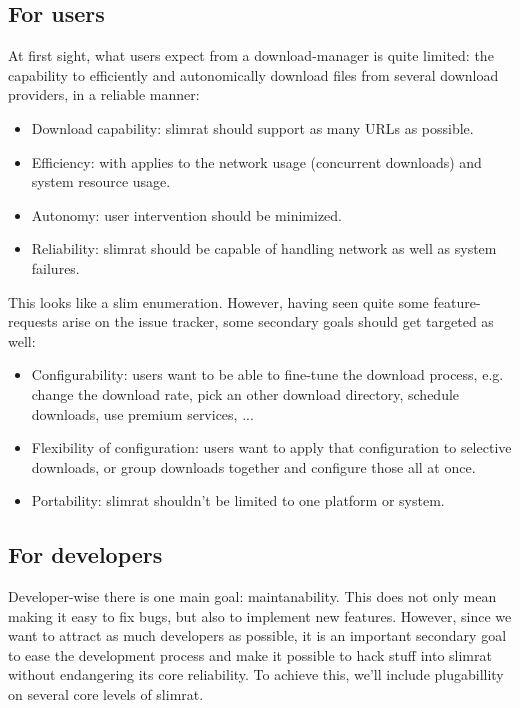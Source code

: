\documentclass{article}
\begin{document}
\subsection{For users}

At first sight, what users expect from a download-manager is quite limited: the capability to efficiently and autonomically download files from several download providers, in a reliable manner:
\begin{itemize}
\item{Download capability: slimrat should support as many URLs as possible.}
\item{Efficiency: with applies to the network usage (concurrent downloads) and system resource usage.}
\item{Autonomy: user intervention should be minimized.}
\item{Reliability: slimrat should be capable of handling network as well as system failures.}
\end{itemize}

This looks like a slim enumeration. However, having seen quite some feature-requests arise on the issue tracker, some secondary goals should get targeted as well:
\begin{itemize}
\item{Configurability: users want to be able to fine-tune the download process, e.g. change the download rate, pick an other download directory, schedule downloads, use premium services, ...}
\item{Flexibility of configuration: users want to apply that configuration to selective downloads, or group downloads together and configure those all at once.}
\item{Portability: slimrat shouldn't be limited to one platform or system.}
\end{itemize}

\subsection{For developers}

Developer-wise there is one main goal: maintanability. This does not only mean making it easy to fix bugs, but also to implement new features. However, since we want to attract as much developers as possible, it is an important secondary goal to ease the development process and make it possible to hack stuff into slimrat without endangering its core reliability. To achieve this, we'll include plugabillity on several core levels of slimrat.
\end{document}
